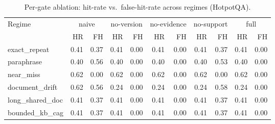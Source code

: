 \begin{table}[t]
\centering\small
\caption{Per-gate ablation: hit-rate vs.\ false-hit-rate across regimes (HotpotQA).}
\label{tab:ablation}
\begin{tabular}{l rr rr rr rr rr }
\toprule
 Regime & \multicolumn{2}{c}{naive} & \multicolumn{2}{c}{no-version} & \multicolumn{2}{c}{no-evidence} & \multicolumn{2}{c}{no-support} & \multicolumn{2}{c}{full} \\
\cmidrule(lr){2-3}\cmidrule(lr){4-5}\cmidrule(lr){6-7}\cmidrule(lr){8-9}\cmidrule(lr){10-11}
 & HR & FH & HR & FH & HR & FH & HR & FH & HR & FH \\
\midrule
exact\_repeat & 0.41 & 0.37 & 0.41 & 0.00 & 0.41 & 0.00 & 0.41 & 0.37 & 0.41 & 0.00 \\
paraphrase & 0.40 & 0.56 & 0.40 & 0.00 & 0.40 & 0.00 & 0.40 & 0.53 & 0.40 & 0.00 \\
near\_miss & 0.62 & 0.00 & 0.62 & 0.00 & 0.62 & 0.00 & 0.62 & 0.00 & 0.62 & 0.00 \\
document\_drift & 0.62 & 0.56 & 0.24 & 0.00 & 0.24 & 0.00 & 0.24 & 0.58 & 0.24 & 0.00 \\
long\_shared\_doc & 0.41 & 0.37 & 0.41 & 0.00 & 0.41 & 0.00 & 0.41 & 0.37 & 0.41 & 0.00 \\
bounded\_kb\_cag & 0.41 & 0.37 & 0.41 & 0.00 & 0.41 & 0.00 & 0.41 & 0.37 & 0.41 & 0.00 \\
\bottomrule
\end{tabular}
\end{table}
